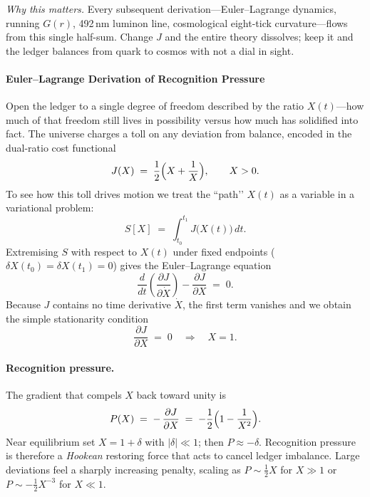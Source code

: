 \documentclass[11pt,oneside]{book}
\begin{document}
\medskip
\noindent
\emph{Why this matters.}  
Every subsequent derivation—Euler–Lagrange dynamics, running $G(r)$,
492\,nm luminon line, cosmological eight-tick curvature—flows from this
single half-sum.  
Change $J$ and the entire theory dissolves; keep it and the ledger
balances from quark to cosmos with not a dial in sight.

\paragraph{Euler–Lagrange Derivation of Recognition Pressure}
\label{ssec:EL-rec-pressure}

Open the ledger to a single degree of freedom described by the ratio
\(X(t)\)—how much of that freedom still lives in possibility versus how
much has solidified into fact.  
The universe charges a toll on any deviation from balance, encoded in
the dual-ratio cost functional
\[
  J(X) \;=\; \frac12\Bigl(X + \frac1{X}\Bigr),
  \qquad X>0.
\]
To see how this toll drives motion we treat the “path’’
\(X(t)\) as a variable in a variational problem:  
\[
  S[X] \;=\; \int_{t_0}^{t_1} J\!\bigl(X(t)\bigr)\,dt.
\]
Extremising \(S\) with respect to \(X(t)\) under fixed endpoints
(\(\delta X(t_0)=\delta X(t_1)=0\)) gives the Euler–Lagrange equation
\[
  \frac{d}{dt}\!\left(\frac{\partial J}{\partial \dot X}\right)
  - \frac{\partial J}{\partial X} \;=\; 0.
\]
Because \(J\) contains no time derivative \(\dot X\),
the first term vanishes and we obtain the simple stationarity
condition
\[
  \frac{\partial J}{\partial X}
  \;=\;
  0
  \quad\Longrightarrow\quad
  X = 1.
\]

\paragraph*{Recognition pressure.}
The gradient that compels \(X\) back toward unity is
\[
  P(X)
  \;=\;
  -\,\frac{\partial J}{\partial X}
  \;=\;
  -\frac12\Bigl(1 - \frac1{X^{2}}\Bigr).
\]
Near equilibrium set \(X=1+\delta\) with \(|\delta|\ll1\);  
then \(P \approx -\delta\).  
Recognition pressure is therefore a \emph{Hookean} restoring force that
acts to cancel ledger imbalance.  
Large deviations feel a sharply increasing penalty, scaling as
\(P\sim \tfrac12 X\) for \(X\gg1\) or \(P\sim -\tfrac12 X^{-3}\) for
\(X\ll1\).
\end{document}
